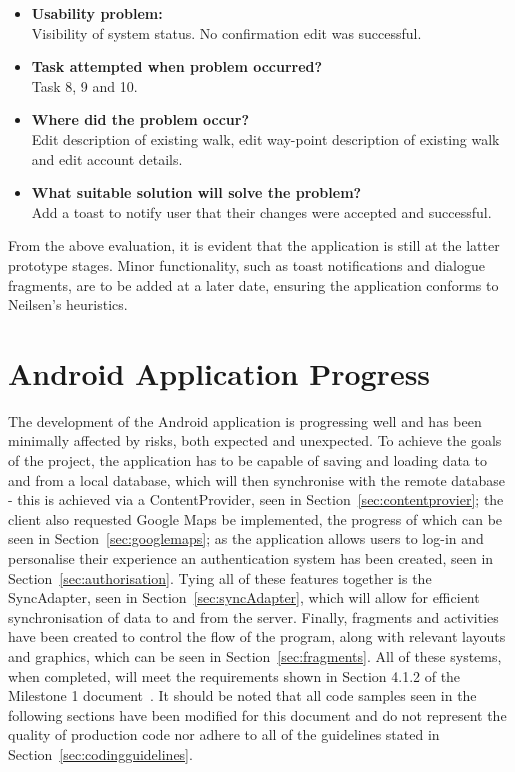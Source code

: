 \documentclass[11pt,a4paper]{article}
\begin{document}
\begin{itemize}
	\item\textbf{Usability problem:}\\
	Visibility of system status. No confirmation edit was successful.

	\item\textbf{Task attempted when problem occurred?}\\
	Task 8, 9 and 10.

	\item\textbf{Where did the problem occur?}\\
	Edit description of existing walk, edit way-point description of existing walk and edit account details.

	\item\textbf{What suitable solution will solve the problem?}\\
	Add a toast to notify user that their changes were accepted and successful.

\end{itemize}

From the above evaluation, it is evident that the application is still at the latter prototype stages. Minor functionality, such as toast notifications and dialogue fragments, are to be added at a later date, ensuring the application conforms to Neilsen's heuristics.



\section{Android Application Progress}
The development of the Android application is progressing well and has been minimally affected by risks, both expected and unexpected. To achieve the goals of the project, the application has to be capable of saving and loading data to and from a local database, which will then synchronise with the remote database - this is achieved via a ContentProvider, seen in Section~\ref{sec:contentprovier}; the client also requested Google Maps be implemented, the progress of which can be seen in Section~\ref{sec:googlemaps}; as the application allows users to log-in and personalise their experience an authentication system has been created, seen in Section~\ref{sec:authorisation}. Tying all of these features together is the SyncAdapter, seen in Section~\ref{sec:syncAdapter}, which will allow for efficient synchronisation of data to and from the server. Finally, fragments and activities have been created to control the flow of the program, along with relevant layouts and graphics, which can be seen in Section~\ref{sec:fragments}. All of these systems, when completed, will meet the requirements shown in Section 4.1.2 of the Milestone 1 document~\cite{initialDoc}. It should be noted that all code samples seen in the following sections have been modified for this document and do not represent the quality of production code nor adhere to all of the guidelines stated in Section~\ref{sec:codingguidelines}.
\end{document}
